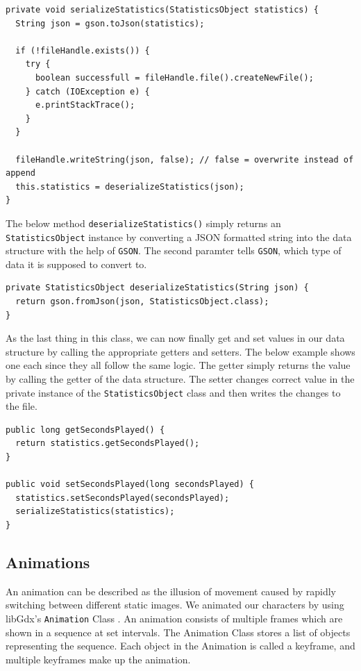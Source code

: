 \documentclass[12p]{article}
\begin{document}
\begin{verbatim}
private void serializeStatistics(StatisticsObject statistics) {
  String json = gson.toJson(statistics);

  if (!fileHandle.exists()) {
    try {
      boolean successfull = fileHandle.file().createNewFile();
    } catch (IOException e) {
      e.printStackTrace();
    }
  }

  fileHandle.writeString(json, false); // false = overwrite instead of append
  this.statistics = deserializeStatistics(json);
}
\end{verbatim}

The below method \texttt{deserializeStatistics()} simply returns an \texttt{StatisticsObject} instance by converting a JSON formatted string into the data structure with the help of \texttt{GSON}. The second paramter tells \texttt{GSON}, which type of data it is supposed to convert to.

\begin{verbatim}
private StatisticsObject deserializeStatistics(String json) {
  return gson.fromJson(json, StatisticsObject.class);
}
\end{verbatim}

As the last thing in this class, we can now finally get and set values in our data structure by calling the appropriate getters and setters. The below example shows one each since they all follow the same logic. The getter simply returns the value by calling the getter of the data structure. The setter changes correct value in the private instance of the \texttt{StatisticsObject} class and then writes the changes to the file.

\begin{verbatim}
public long getSecondsPlayed() {
  return statistics.getSecondsPlayed();
}

public void setSecondsPlayed(long secondsPlayed) {
  statistics.setSecondsPlayed(secondsPlayed);
  serializeStatistics(statistics);
}
\end{verbatim}


\newpage
\subsection{Animations} \label{DocAnimations}

An animation can be described as the illusion of movement caused by rapidly switching between different static images. We animated our characters by using libGdx's \texttt{Animation} Class \cite{libGdxAnimClass}. An animation consists of multiple frames which are shown in a sequence at set intervals. The Animation Class stores a list of objects representing the sequence. Each object in the Animation is called a keyframe, and multiple keyframes make up the animation.
\end{document}
